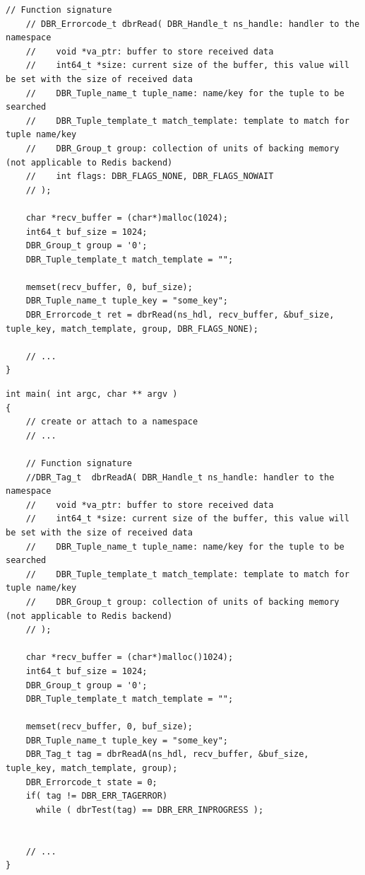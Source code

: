 \begin{enumerate}
\begin{lstlisting}[style=mystyle,basicstyle=\scriptsize\ttfamily,caption=Read data from the namespace (blocking), label=code:read]
	// Function signature
	// DBR_Errorcode_t dbrRead( DBR_Handle_t ns_handle: handler to the namespace
    //    void *va_ptr: buffer to store received data
    //    int64_t *size: current size of the buffer, this value will be set with the size of received data 
    //    DBR_Tuple_name_t tuple_name: name/key for the tuple to be searched
    //    DBR_Tuple_template_t match_template: template to match for tuple name/key
    //    DBR_Group_t group: collection of units of backing memory (not applicable to Redis backend)
    //    int flags: DBR_FLAGS_NONE, DBR_FLAGS_NOWAIT
    // );
	
	char *recv_buffer = (char*)malloc(1024);
	int64_t buf_size = 1024;
	DBR_Group_t group = '0';
	DBR_Tuple_template_t match_template = "";
    
    memset(recv_buffer, 0, buf_size);
	DBR_Tuple_name_t tuple_key = "some_key";
	DBR_Errorcode_t ret = dbrRead(ns_hdl, recv_buffer, &buf_size, tuple_key, match_template, group, DBR_FLAGS_NONE);
	
	// ...
}
\end{lstlisting}
  
\begin{lstlisting}[style=mystyle,basicstyle=\scriptsize\ttfamily,caption=Read data from the namespace (non-blocking), label=code:readA]
int main( int argc, char ** argv )
{
	// create or attach to a namespace
	// ...

    // Function signature
    //DBR_Tag_t  dbrReadA( DBR_Handle_t ns_handle: handler to the namespace 
    //    void *va_ptr: buffer to store received data
    //    int64_t *size: current size of the buffer, this value will be set with the size of received data 
    //    DBR_Tuple_name_t tuple_name: name/key for the tuple to be searched
    //    DBR_Tuple_template_t match_template: template to match for tuple name/key
    //    DBR_Group_t group: collection of units of backing memory (not applicable to Redis backend)
    // );

	char *recv_buffer = (char*)malloc()1024);
	int64_t buf_size = 1024;
	DBR_Group_t group = '0';
	DBR_Tuple_template_t match_template = "";
	
	memset(recv_buffer, 0, buf_size);
	DBR_Tuple_name_t tuple_key = "some_key";
	DBR_Tag_t tag = dbrReadA(ns_hdl, recv_buffer, &buf_size, tuple_key, match_template, group);
	DBR_Errorcode_t state = 0;
	if( tag != DBR_ERR_TAGERROR)
      while ( dbrTest(tag) == DBR_ERR_INPROGRESS );

	
	// ...
}
\end{lstlisting}



\end{enumerate}
